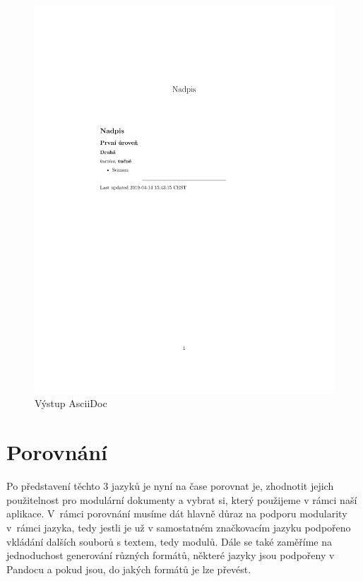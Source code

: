 \begin{figure}[h]
    \centering
    \includegraphics[width=\textwidth]{example-ascii.pdf}
    \caption{Výstup AsciiDoc}
    \label{fig:asciiOutput}
\end{figure}

\clearpage

\section{Porovnání}

Po představení těchto 3 jazyků je nyní na čase porovnat je, zhodnotit jejich použitelnost pro modulární dokumenty a vybrat si, který použijeme v rámci naší aplikace.
V~rámci porovnání musíme dát hlavně důraz na podporu modularity v~rámci jazyka, tedy jestli je už v samostatném značkovacím jazyku podpořeno vkládání dalších
souborů s textem, tedy modulů. Dále se také zaměříme na jednoduchost generování různých formátů, některé jazyky jsou podpořeny v Pandocu a pokud jsou, do jakých
formátů je lze převést.

